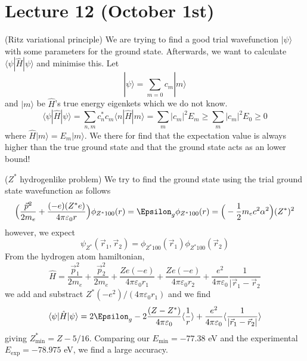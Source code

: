 \section{Lecture 12 (October 1st)}
\begin{defi}
(Ritz variational principle) We are trying to find a good trial wavefunction $|\psi \rangle $ with some parameters for the ground state. Afterwards, we want to calculate $\langle \psi |\hat{H}|\psi \rangle $ and minimise this. Let
\[|\psi \rangle =\sum _{m=0}c_{m}|m\rangle \]
and $|m\rangle $ be $\hat{H}$'s true energy eigenkets which we do not know.
\[\langle \psi |\hat{H}|\psi \rangle =\sum _{n,m}c_{n}^{*}c_{m}\langle n|\hat{H}|m\rangle=\sum _{m}|c_{m}|^2E_{m}\geq \sum _{m}|c_{m}|^2E_0\geq 0 \]
where $\hat{H}|m\rangle =E_{m}|m\rangle $. We there for find that the expectation value is always higher than the true ground state and that the ground state acts as an lower bound!
\end{defi}
\vspace{2ex}
\begin{ex}
($Z^{*}$ hydrogenlike problem) We try to find the ground state using the trial ground state wavefunction as follows
\[\Big(\dfrac{\vec{p}^2}{2m_{e}}+\dfrac{(-e)(Z^{*}e)}{4\pi \varepsilon_0 r}\Big)\phi _{Z^{*}100}(r)=\Epsilon_{g}\phi _{Z^{*}100}(r)=\Big(-\dfrac{1}{2}m_{e}c^2\alpha ^2\Big)(Z^{*})^2\]
however, we expect
\[\psi _{Z^{*}}(\vec{r}_{1},\vec{r}_{2})=\phi _{Z^{*}100}(\vec{r}_{1})\phi _{Z^{*}100}(\vec{r}_{2})\]
From the hydrogen atom hamiltonian,
\[\hat{H}=\dfrac{\vec{p}_{1}^2}{2m_{e}}+\dfrac{\vec{p}_{2}^2}{2m_{e}}+\dfrac{Ze(-e)}{4\pi \varepsilon _{0}r_1}+\dfrac{Ze(-e)}{4\pi \varepsilon_0r_2}+\dfrac{e^2}{4\pi \varepsilon_0}\dfrac{1}{|\vec{r}_{1}-\vec{r}_{2}}\]
we add and substract $Z^{*}(-e^2)/(4\pi \varepsilon_0r_1)$ and we find
\[\langle \psi |\hat{H}|\psi \rangle =2\Epsilon_{g}-2\dfrac{(Z-Z^{*})}{4\pi \varepsilon _{0}}\langle \dfrac{1}{r}\rangle +\dfrac{e^2}{4\pi \varepsilon_0}\langle \dfrac{1}{|\vec{r}_{1}-\vec{r}_{2}|}\rangle \]
giving $Z^{*}_{\mathrm{min}}=Z-5/16$. Comparing our $E_{\mathrm{min}}=-77.38$ eV and the experimental $E_{\mathrm{exp}}=-78.975$ eV, we find a large accuracy. 
\end{ex}
\vspace{2ex}

